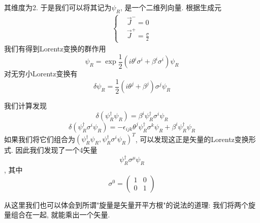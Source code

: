 \begin{example}
    其维度为2. 于是我们可以将其记为$\psi_R$, 是一个二维列向量. 根据生成元
    \begin{align}
        \begin{cases}
            &\vec J^-=0\\
            &\vec J^+=\frac{\sigma}2
        \end{cases}
    \end{align}
    我们有得到Lorentz变换的群作用
    \begin{equation}
        \psi_R=\exp{\frac12(i\theta^i\sigma^i+\beta^i\sigma^i)}\psi_R        
    \end{equation}
    对无穷小Lorentz变换有
    \begin{equation}
        \delta\psi_R=\frac12(i\theta^j+\beta^j)\sigma^j\psi_R
    \end{equation}

    我们计算发现
    \begin{equation}
        \delta(\psi_R^\dagger\psi_R)=\beta^i\psi_R^\dagger\sigma^i\psi_R
    \end{equation}
    \begin{equation}
        \delta(\psi_R^\dagger\sigma^i\psi_R)=-\epsilon_{ijk}\theta^j\psi_R^\dagger\sigma^k\psi_R+\beta^i\psi_R^\dagger\psi_R
    \end{equation}
    如果我们将它们组合为$(\psi_R^\dagger\psi_R, \psi_R^\dagger\sigma^i\psi_R)^T$, 可以发现这正是矢量的Lorentz变换形式. 因此我们发现了一个4矢量
    \begin{equation}
        \psi_R^\dagger\sigma^\mu\psi_R
    \end{equation}, 其中
    \begin{equation}
        \sigma^0=\begin{pmatrix}
            1 & 0 \\
            0 & 1
        \end{pmatrix}
    \end{equation}

    从这里我们也可以体会到所谓"旋量是矢量开平方根"的说法的道理: 我们将两个旋量组合在一起, 就能乘出一个矢量.
\end{example}
